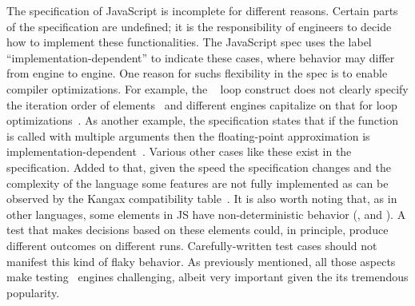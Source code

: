 \documentclass[smallextended]{svjour3}
\begin{document}
The specification of JavaScript is incomplete for different
reasons. Certain parts of the specification are undefined; it is the
responsibility of engineers to decide how to implement these
functionalities. The JavaScript spec uses the label
``implementation-dependent'' to indicate these cases, where behavior
may differ from engine to engine. One reason for suchs flexibility in
the spec is to enable compiler optimizations. For example, the
\js\  loop construct does not clearly specify the
iteration order of
elements~\cite{so-forin-undefined,javascript-in-chrome} and different
engines capitalize on that for loop
optimizations~\cite{for-in-undefined}.  As another example, the
specification states that if the 
function is called with multiple arguments then the floating-point
approximation is
implementation-dependent~\cite{es6-toPrecision}. Various other cases
like these exist in the specification. Added to that, given the speed
the specification changes and the complexity of the language some
features are not fully implemented as can be observed by the Kangax
compatibility table~\cite{kangax}.  It is also worth noting that, as
in other languages, some elements in JS have non-deterministic
behavior (\eg{},  and ). A test
that makes decisions based on these elements could, in principle,
produce different outcomes on different runs. Carefully-written test
cases should not manifest this kind of flaky behavior.  As previously
mentioned, all those aspects make testing \js\ engines challenging,
albeit very important given the its tremendous popularity.





\end{document}
